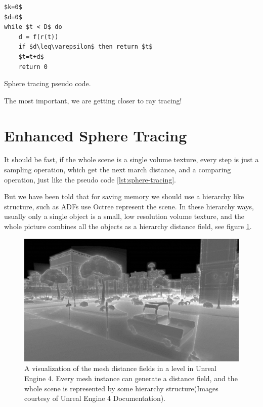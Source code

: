\begin{algorithm}\label{lst:sphere-tracing]}
\begin{lstlisting}[mathescape]
$k=0$
$d=0$
while $t < D$ do
	d = f(r(t))
	if $d\leq\varepsilon$ then return $t$
	$t=t+d$
	return 0
\end{lstlisting}
\caption{Sphere tracing pseudo code.}
\end{algorithm}

The most important, we are getting closer to ray tracing!

\section{Enhanced Sphere Tracing}
It should be fast, if the whole scene is a single volume texture, every step is just a sampling operation, which get the next march distance, and a comparing operation, just like the pseudo code \ref{lst:sphere-tracing}. 

But we have been told that for saving memory we should use a hierarchy like structure, such as ADFs use Octree represent the scene. In these hierarchy ways, usually only a single object is a small, low resolution volume texture, and the whole picture combines all the objects as a hierarchy distance field, see figure \ref{f:visualize-mesh-distance-fields}.

\begin{figure}\label{f:visualize-mesh-distance-fields}
	\includegraphics[width=1.0\textwidth]{graphics/df/VisualizeMeshDistanceFields}
	\caption{A visualization of the mesh distance fields in a level in Unreal Engine 4. Every mesh instance can generate a distance field, and the whole scene is represented by some hierarchy structure(Images courtesy of Unreal Engine 4 Documentation). }
\end{figure}

